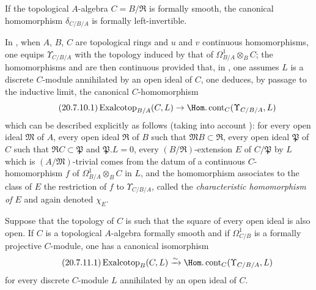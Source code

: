 \begin{corollary}[20.7.9]
\label{0.20.7.9}
If the topological $A$-algebra $C=B/\mathfrak{R}$ is formally smooth, the canonical homomorphism $\delta_{C/B/A}$ is formally left-invertible.
\end{corollary}

\begin{env}[20.7.10]
\label{0.20.7.10}
In , when $A$, $B$, $C$ are topological rings and $u$ and $v$ continuous homomorphisms, one equips $\Upsilon_{C/B/A}$ with the topology induced by that of $\Omega^1_{B/A}\otimes_B C$; the homomorphisms  and  are then continuous provided that, in , one assumes $L$ is a discrete $C$-module annihilated by an open ideal of $C$, one deduces, by passage to the inductive limit, the canonical $C$-homomorphism
\begin{equation}
\tag{20.7.10.1}
  \label{0.20.7.10.1}
  \operatorname{Exalcotop}_{B/A}(C,L)\to\Hom.\operatorname{cont}_C(\Upsilon_{C/B/A},L)
\end{equation}
which can be described explicitly as follows (taking into account ): for every open ideal $\mathfrak{M}$ of $A$, every open ideal $\mathfrak{R}$ of $B$ such that $\mathfrak{M}B\subset\mathfrak{R}$, every open ideal $\mathfrak{P}$ of $C$ such that $\mathfrak{R}C\subset\mathfrak{P}$ and $\mathfrak{P}.L=0$, every $(B/\mathfrak{R})$-extension $E$ of $C/\mathfrak{P}$ by $L$ which is $(A/\mathfrak{M})$-trivial comes from the datum of a continuous $C$-homomorphism $f$ of $\Omega^1_{B/A}\otimes_B C$ in $L$, and the homomorphism  associates to the class of $E$ the restriction of $f$ to $\Upsilon_{C/B/A}$, called the \emph{characteristic homomorphism of $E$} and again denoted $\chi_E$.
\end{env}

\begin{proposition}[20.7.11]
\label{0.20.7.11}
Suppose that the topology of $C$ is such that the square of every open ideal is also open.
If $C$ is a topological $A$-algebra formally smooth and if $\Omega^1_{C/B}$ is a formally projective $C$-module, one has a canonical isomorphism
\begin{equation}
\tag{20.7.11.1}
  \label{0.20.7.11.1}
  \operatorname{Exalcotop}_B(C,L)\xrightarrow{\sim}\Hom.\operatorname{cont}_C(\Upsilon_{C/B/A},L)
\end{equation}
for every discrete $C$-module $L$ annihilated by an open ideal of $C$.
\end{proposition}

